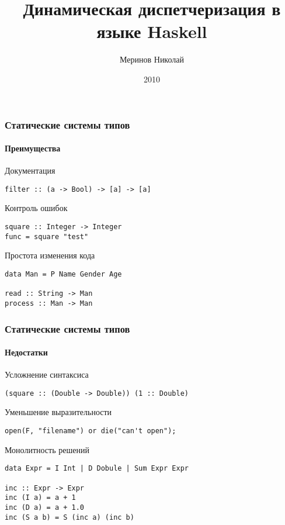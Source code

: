 \documentclass[ucs]{beamer}
\title[Динамическая диспетчеризация]{Динамическая диспетчеризация в языке Haskell}
\author{Меринов Николай}
\institute{УрГУ}
\date{2010}
\begin{document}

\begin{frame}
\titlepage
\end{frame}

\begin{frame}[fragile]
  \frametitle{Статические системы типов}
  \framesubtitle{Преимущества}
  \begin{block}{Документация}
\begin{verbatim}
filter :: (a -> Bool) -> [a] -> [a]
\end{verbatim}
  \end{block}

  \begin{block}{Контроль ошибок}
\begin{verbatim}
square :: Integer -> Integer
func = square "test"
\end{verbatim}
  \end{block}

  \begin{block}{Простота изменения кода}
\begin{verbatim}
data Man = P Name Gender Age

read :: String -> Man
process :: Man -> Man
\end{verbatim}
  \end{block}
\end{frame}

\begin{frame}[fragile]
  \frametitle{Статические системы типов}
  \framesubtitle{Недостатки}

  \begin{block}{Усложнение синтаксиса}
\begin{verbatim}
(square :: (Double -> Double)) (1 :: Double)
\end{verbatim}
  \end{block}

  \begin{block}{Уменьшение выразительности}
\begin{verbatim}
open(F, "filename") or die("can't open");
\end{verbatim}
  \end{block}

  \begin{block}{Монолитность решений}
\begin{verbatim}
data Expr = I Int | D Dobule | Sum Expr Expr

inc :: Expr -> Expr
inc (I a) = a + 1
inc (D a) = a + 1.0
inc (S a b) = S (inc a) (inc b)
\end{verbatim}
  \end{block}
\end{frame}
\end{document}
